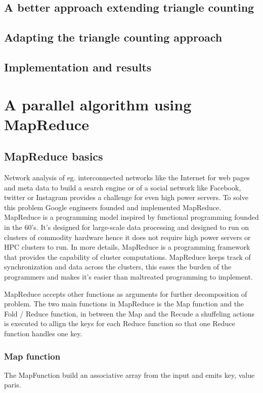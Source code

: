 \documentclass{article}
\begin{document}
\subsection{A better approach extending triangle counting}

\subsection{Adapting the triangle counting approach}

\subsection{Implementation and results}

\section{A parallel algorithm using MapReduce}

\subsection{MapReduce basics}
Network analysis of eg. interconnected networks like the Internet for web pages and meta data to build a search engine or of a social network like Facebook, twitter or Instagram provides a challenge for even high power servers. To solve this problem Google engineers founded and implemented MapReduce. MapReduce is a programming model inspired by functional programming founded in the 60's. It's designed for large-scale data processing and designed to run on clusters of commodity hardware hence it does not require high power servers or HPC clusters to run.
In more details, MapReduce is a programming framework that provides the capability of cluster computations. MapReduce keeps track of synchronization and data across the clusters, this eases the burden of the programmers and makes it's easier than maltreated programming to implement.

\noindent MapReduce accepts other functions as arguments for further decomposition of problem. The two main functions in MapReduce is the Map function and the Fold / Reduce function, in between the Map and the Recude a shuffeling actions is executed to allign the keys for each Reduce function so that one Reduce function handles one key.



\subsubsection{Map function}
The MapFunction build an associative array from the input and emits key, value paris.
\end{document}
